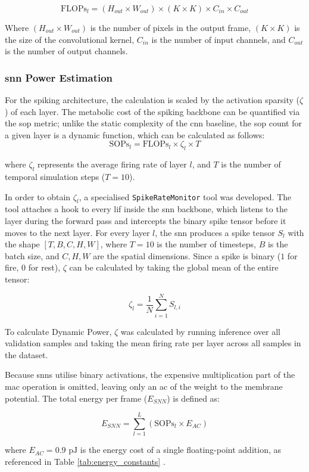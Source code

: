 \begin{equation}
     \mathrm{FLOPs}_l = (H_{out} \times W_{out}) \times (K \times K) \times C_{in} \times C_{out}
\end{equation}

Where $(H_{out} \times W_{out})$ is the number of pixels in the output frame, $(K \times K)$ is the size of the convolutional kernel, $C_{in}$ is the number of input channels, and $C_{out}$ is the number of output channels.


\subsubsection{\gls{snn} Power Estimation}

For the spiking architecture, the calculation is scaled by the activation sparsity ($\zeta$) of each layer.
The metabolic cost of the spiking backbone can be quantified via the \gls{sop} metric;
unlike the static complexity of the \gls{cnn} baseline, the \gls{sop} count for a given layer is a dynamic function, which can be calculated as follows:
\begin{equation}
\mathrm{SOPs}_l = \mathrm{FLOPs}_l \times \zeta_l \times T
\label{eq:sop_zeta}
\end{equation}

\noindent where $\zeta_l$ represents the average firing rate of layer $l$, and $T$ is the number of temporal simulation steps ($T=10$).

In order to obtain $\zeta_l$, a specialised \texttt{SpikeRateMonitor} tool was developed.
The tool attaches a hook to every \gls{lif} inside the \gls{snn} backbone, which listens to the layer during the forward pass and intercepts the binary spike tensor before it moves to the next layer.
For every layer $l$, the \gls{snn} produces a spike tensor $S_l$ with the shape $[T, B, C, H, W]$, where $T = 10$ is the number of timesteps, $B$ is the batch size, and $C, H, W$ are the spatial dimensions.
Since a spike is binary ($1$ for fire, $0$ for rest), $\zeta$ can be calculated by taking the global mean of the entire tensor:

\begin{equation}
    \zeta_l = \frac{1}{N} \sum_{i=1}^{N} S_{l, i}
\end{equation}

To calculate Dynamic Power, $\zeta$ was calculated by running inference over all validation samples and taking the mean firing rate per layer across all samples in the dataset.

Because \glspl{snn} utilise binary activations, the expensive multiplication part of the \gls{mac} operation is omitted, leaving only an \gls{ac} of the weight to the membrane potential.
The total energy per frame ($E_{SNN}$) is defined as:

\begin{equation}
\label{eq:e_snn}
  E_{SNN} = \sum_{l=1}^{L} (\mathrm{SOPs}_l \times E_{AC})
\end{equation}


\noindent where $E_{AC} = 0.9\text{ pJ}$ is the energy cost of a single floating-point addition, as referenced in Table \ref{tab:energy_constants} \cite{horowitz20141}.


